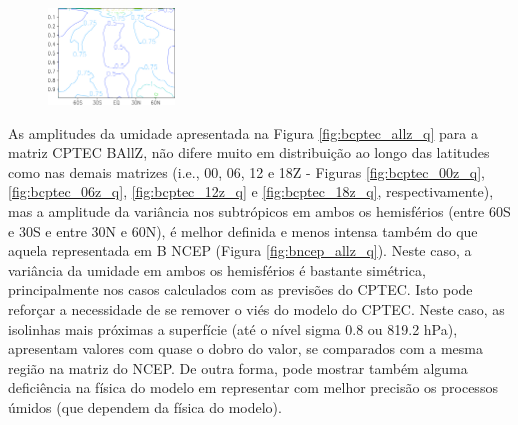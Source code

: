 \begin{figure}[H]
\begin{center}
{          \includegraphics[width=0.3\textwidth,angle=0]{./figs/cap3/amplitudes_novas/amplitudes-B12Z_t-crop-rotated270.pdf}
        }    
  \end{center}
  \vspace{2mm}
  \legenda{}
  \label{fig:B_mcgav4_T}
\end{figure}

As amplitudes da umidade apresentada na Figura \ref{fig:bcptec_allz_q} para a matriz CPTEC BAllZ, não difere muito em distribuição ao longo das latitudes como nas demais matrizes (i.e., 00, 06, 12 e 18Z - Figuras \ref{fig:bcptec_00z_q}, \ref{fig:bcptec_06z_q}, \ref{fig:bcptec_12z_q} e \ref{fig:bcptec_18z_q}, respectivamente), mas a amplitude da variância nos subtrópicos em ambos os hemisférios (entre 60S e 30S e entre 30N e 60N), é melhor definida e menos intensa também do que aquela representada em B NCEP (Figura \ref{fig:bncep_allz_q}). Neste caso, a variância da umidade em ambos os hemisférios é bastante simétrica, principalmente nos casos calculados com as previsões do CPTEC. Isto pode reforçar a necessidade de se remover o viés do modelo do CPTEC. Neste caso, as isolinhas mais próximas a superfície (até o nível sigma 0.8 ou 819.2 hPa), apresentam valores com quase o dobro do valor, se comparados com a mesma região na matriz do NCEP. De outra forma, pode mostrar também alguma deficiência na física do modelo em representar com melhor precisão os processos úmidos (que dependem da física do modelo).


